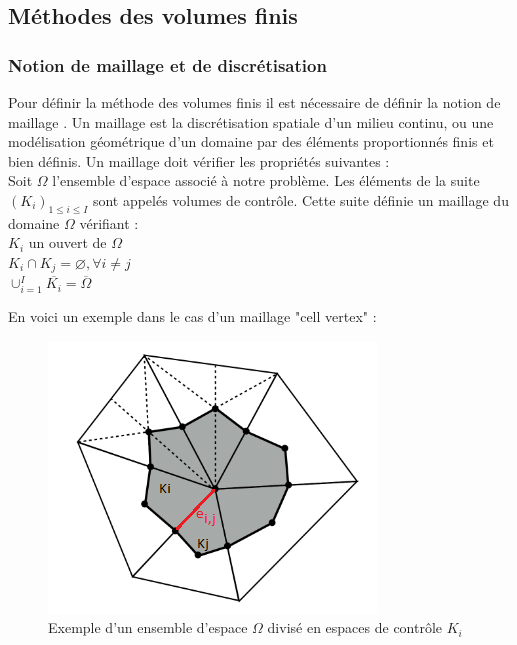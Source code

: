 \documentclass[12pt]{article}
\begin{document}
	
\subsection{Méthodes des volumes finis}

\subsubsection{Notion de maillage et de discrétisation}

\noindent Pour définir la méthode des volumes finis il est nécessaire de définir la notion de maillage \cite{ref12}.
Un maillage est la discrétisation spatiale d'un milieu continu, ou une modélisation géométrique d'un domaine par des éléments proportionnés finis et bien définis. Un maillage doit vérifier les propriétés suivantes :
\\Soit $\Omega$ l'ensemble d'espace associé à notre problème. 
Les éléments de la suite $(K_i)_{1\leq{i}\leq{I}}$ sont appelés volumes de contrôle. Cette suite définie un maillage du domaine $\Omega$  vérifiant :
\\  $K_i$ un ouvert de $\Omega$
\\  $K_i \cap K_j = \varnothing, \forall i \neq j$
\\  $\cup_{i=1}^{I} \overline{K_i} = \overline{\Omega}$

\noindent En voici un exemple dans le cas d'un maillage "cell vertex" :

    \begin{figure}[H]
	\centering
	\includegraphics[scale=0.5]{Ki.png}
	\caption{Exemple d'un ensemble d'espace $\Omega$ divisé en espaces de contrôle $K_i$}
	\label{Ki}
	\end{figure}
\newpage
\end{document}

